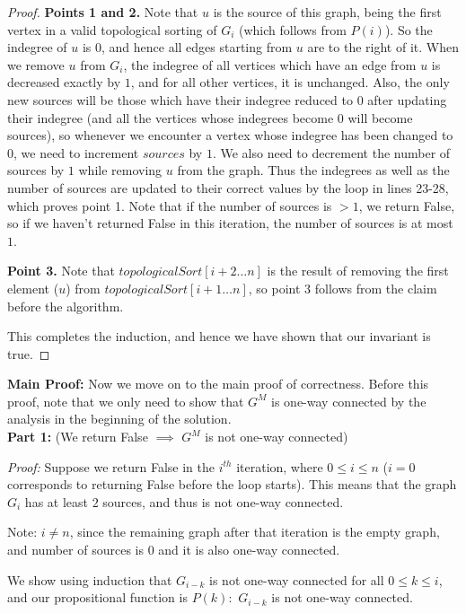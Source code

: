 \documentclass[answers]{exam}
\begin{document}
\begin{questions}
\begin{solution}
\begin{proof}
\textbf{Points 1 and 2.} Note that $u$ is the source of this graph, being the first vertex in a valid topological sorting of $G_{i}$ (which follows from $P(i)$). So the indegree of $u$ is $0$, and hence all edges starting from $u$ are to the right of it. When we remove $u$ from $G_i$, the indegree of all vertices which have an edge from $u$ is decreased exactly by $1$, and for all other vertices, it is unchanged. Also, the only new sources will be those which have their indegree reduced to $0$ after updating their indegree (and all the vertices whose indegrees become 0 will become sources), so whenever we encounter a vertex whose indegree has been changed to $0$, we need to increment $sources$ by $1$. We also need to decrement the number of sources by $1$ while removing $u$ from the graph. Thus the indegrees as well as the number of sources are updated to their correct values by the loop in lines 23-28, which proves point 1. Note that if the number of sources is $> 1$, we return False, so if we haven't returned False in this iteration, the number of sources is at most $1$.

\textbf{Point 3.} 
Note that $topologicalSort[i + 2\dots n]$ is the result of removing the first element ($u$) from $topologicalSort[i + 1\dots n]$, so point 3 follows from the claim before the algorithm.

This completes the induction, and hence we have shown that our invariant is true.
\end{proof}


\textbf{Main Proof:} Now we move on to the main proof of correctness. Before this proof, note that we only need to show that $G^M$ is one-way connected by the analysis in the beginning of the solution.\\

\textbf{Part 1:} (We return False $\implies$ $G^M$ is not one-way connected)

\textit{Proof:} Suppose we return False in the $i^{th}$ iteration, where $0 \le i \le n$ ($i = 0$ corresponds to returning False before the loop starts). This means that the graph $G_i$ has at least $2$ sources, and thus is not one-way connected.

Note: $i \ne n$, since the remaining graph after that iteration is the empty graph, and number of sources is $0$ and it is also one-way connected.

We show using induction that $G_{i - k}$ is not one-way connected for all $0 \le k \le i$, and our propositional function is $P(k):$ $G_{i - k}$ is not one-way connected.


\end{solution}
\end{questions}
\end{document}
